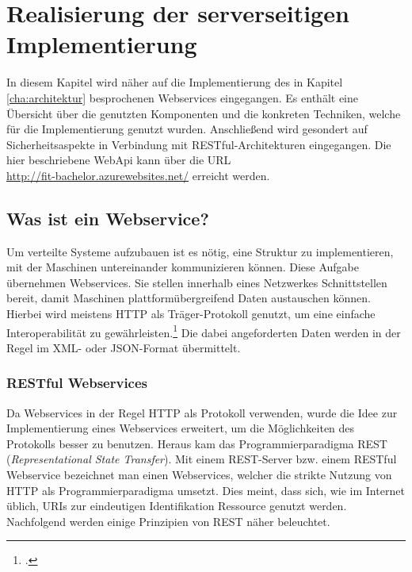 \chapter{Realisierung der serverseitigen Implementierung}
\label{cha:server-impl}
In diesem Kapitel wird näher auf die Implementierung des in Kapitel \ref{cha:architektur} besprochenen Webservices eingegangen. Es enthält eine Übersicht über die genutzten Komponenten und die konkreten Techniken, welche für die Implementierung genutzt wurden. Anschließend wird gesondert auf Sicherheitsaspekte in Verbindung mit \ac{RESTful}-Architekturen eingegangen. Die hier beschriebene WebApi kann über die \ac{URL} \\ \href{http://fit-bachelor.azurewebsites.net/}{http://fit-bachelor.azurewebsites.net/} erreicht werden. 
\section{Was ist ein Webservice?}
\label{sec:definition-webservice}
Um verteilte Systeme aufzubauen ist es nötig, eine Struktur zu implementieren, mit der Maschinen untereinander kommunizieren können. Diese Aufgabe übernehmen Webservices. Sie stellen innerhalb eines Netzwerkes Schnittstellen bereit, damit Maschinen plattformübergreifend Daten austauschen können. Hierbei wird meistens \ac{HTTP} als Träger-Protokoll genutzt, um eine einfache Interoperabilität zu gewährleisten.\footcite{Definition-Webservice} Die dabei angeforderten Daten werden in der Regel im \ac{XML}- oder \ac{JSON}-Format übermittelt. 
\subsection{RESTful Webservices}
\label{sec:definition-rest}
Da Webservices in der Regel HTTP als Protokoll verwenden, wurde die Idee zur Implementierung eines Webservices erweitert, um die Möglichkeiten des Protokolls besser zu benutzen. Heraus kam das Programmierparadigma REST (\textit{Representational State Transfer}). Mit einem REST-Server bzw. einem RESTful Webservice bezeichnet man einen Webservices, welcher die strikte Nutzung von HTTP als Programmierparadigma umsetzt.  Dies meint, dass sich, wie im Internet üblich, \ac{URIs} zur eindeutigen Identifikation Ressource genutzt werden. Nachfolgend werden einige Prinzipien von REST näher beleuchtet.

